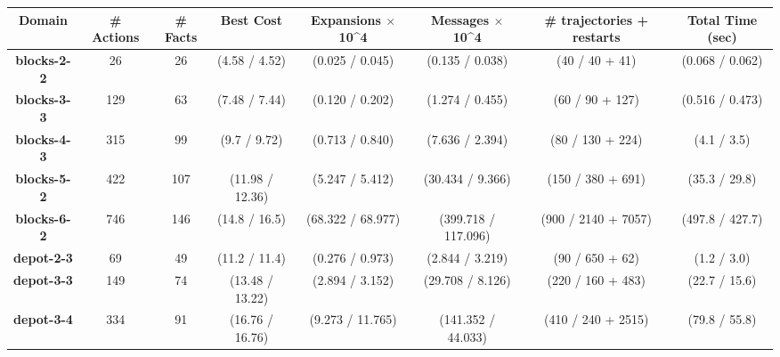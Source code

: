 \documentclass[letterpaper]{article} %
\theoremstyle{remark}
\begin{document}
\begin{table*}[]
\centering
\scriptsize
\begin{adjustbox}{width=1.53\columnwidth}
\begin{tabular}{|c|c|c||c|c|c|c|c|}
\hline
\textbf{Domain}        & \textbf{\# Actions} & \textbf{\# Facts} & \textbf{Best Cost} & \textbf{Expansions $\times$ 10\textasciicircum{}4} & \textbf{Messages $\times$ 10\textasciicircum{}4} & \textbf{\# trajectories + restarts} & \textbf{Total Time (sec)} \\ \hline\hline
\textbf{blocks-2-2}    & 26                  & 26                & (4.58 / 4.52)      & (0.025 / 0.045)                             & (0.135 / 0.038)                           & (40 / 40 + 41)                & (0.068 / 0.062)           \\ \hline
\textbf{blocks-3-3}    & 129                 & 63                & (7.48 / 7.44)      & (0.120 / 0.202)                             & (1.274 / 0.455)                           & (60 / 90 + 127)                & (0.516 / 0.473)           \\ \hline
\textbf{blocks-4-3}    & 315                 & 99                & (9.7 / 9.72)       & (0.713 / 0.840)                             & (7.636 / 2.394)                           & (80 / 130 + 224)               & (4.1 / 3.5)               \\ \hline
\textbf{blocks-5-2}    & 422                 & 107               & (11.98 / 12.36)    & (5.247 / 5.412)                             & (30.434 / 9.366)                          & (150 / 380 + 691)              & (35.3 / 29.8)             \\ \hline
\textbf{blocks-6-2}    & 746                 & 146               & (14.8 / 16.5)      & (68.322 / 68.977)                           & (399.718 / 117.096)                       & (900 / 2140 + 7057)             & (497.8 / 427.7)           \\ \hline\hline
\textbf{depot-2-3}     & 69                  & 49                & (11.2 / 11.4)      & (0.276 / 0.973)                             & (2.844 / 3.219)                           & (90 / 650 + 62)               & (1.2 / 3.0)               \\ \hline
\textbf{depot-3-3}     & 149                 & 74                & (13.48 / 13.22)    & (2.894 / 3.152)                             & (29.708 / 8.126)                          & (220 / 160 + 483)              & (22.7 / 15.6)             \\ \hline
\textbf{depot-3-4}     & 334                 & 91                & (16.76 / 16.76)    & (9.273 / 11.765)                            & (141.352 / 44.033)                        & (410 / 240 + 2515)              & (79.8 / 55.8)             \\ \hline

\end{tabular}
\end{adjustbox}
\end{table*}
\end{document}
